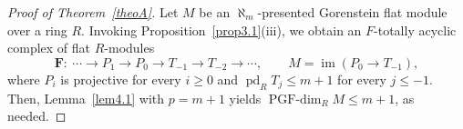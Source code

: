 \documentclass[12pt]{amsart}
\theoremstyle{remark}
\newtheorem{remark}[theorem]{Remark}
\theoremstyle{definition}
\theoremstyle{plain}
\DeclareMathOperator{\Gpd}{Gpd}
\DeclareMathOperator{\pd}{pd}
\DeclareMathOperator{\Tor}{Tor}
\DeclareMathOperator{\im}{im}
\newcommand{\PGFdim}{\operatorname{PGF\text{-}dim}}
\newcommand{\Z}{\mathbb{Z}}
\newcommand{\Q}{\mathbb{Q}}
\newcommand{\alephm}{\aleph_m}
\begin{document}





\begin{proof}[Proof of Theorem~\ref{theoA}]
 Let $M$ be an $\alephm$-presented Gorenstein flat module over a ring $R$. Invoking Proposition~\ref{prop3.1}(iii), we obtain an $F$-totally acyclic complex of flat $R$-modules
\[
\mathbf F:\ \cdots\rightarrow P_1\rightarrow P_0\rightarrow T_{-1}\rightarrow T_{-2}\rightarrow\cdots,
\qquad M=\im(P_0\to T_{-1}),
\] where $P_i$ is projective for every $i\geq 0$ and $\pd_RT_j\leq m+1$ for every $j\le-1$. Then, Lemma~\ref{lem4.1} with $p=m+1$ yields $\PGFdim_RM\le m+1$, as needed.
\end{proof}


\end{document}
